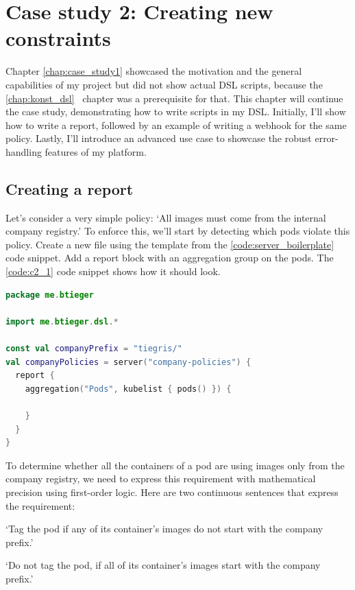 \chapter{Case study 2: Creating new constraints}
\label{chap:case_study2}

Chapter \ref{chap:case_study1} showcased the motivation and the general capabilities of my project but did not show actual DSL scripts, because the \ref{chap:konst_dsl}~ chapter was a prerequisite for that. This chapter will continue the case study, demonstrating how to write scripts in my DSL. Initially, I'll show how to write a report, followed by an example of writing a webhook for the same policy. Lastly, I'll introduce an advanced use case to showcase the robust error-handling features of my platform.

\section{Creating a report}

Let's consider a very simple policy: `All images must come from the internal company registry.' To enforce this, we'll start by detecting which pods violate this policy. Create a new file using the template from the \ref{code:server_boilerplate} code snippet. Add a report block with an aggregation group on the pods. The \ref{code:c2_1} code snippet shows how it should look.

\begin{minipage}{\linewidth}
\begin{lstlisting}[caption={Report skeleton},language=Kotlin,label=code:c2_1]
package me.btieger

import me.btieger.dsl.*

const val companyPrefix = "tiegris/"
val companyPolicies = server("company-policies") {
  report {
    aggregation("Pods", kubelist { pods() }) {
  
    }
  }
}
\end{lstlisting}
\end{minipage}

To determine whether all the containers of a pod are using images only from the company registry, we need to express this requirement with mathematical precision using first-order logic. Here are two continuous sentences that express the requirement:

`Tag the pod if any of its container's images do not start with the company prefix.'

`Do not tag the pod, if all of its container's images start with the company prefix.'

